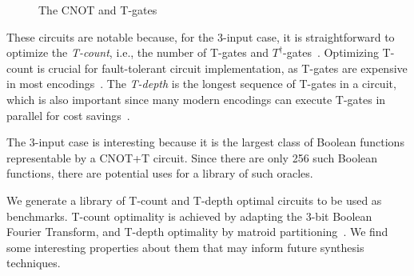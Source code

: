 \documentclass[a4paper]{article}
\makeatletter
\newcommand{\sublabel}[1]{\protected@edef\@currentlabel{\thefigure(\thesubfigure)}\label{#1}}
\makeatother
\begin{document}
\vspace{0.3cm}

\begin{figure}[t]
  \begin{minipage}{0.45\linewidth}
    \centering
    \scalebox{1.0} {
      
    }
    \sublabel{fig-sgate}
    \scalebox{1.0} {
      
    }
    \sublabel{fig-sdgate}
    \scalebox{1.0}{
      
    }
    \sublabel{fig-cnot}
  \end{minipage}
  \begin{minipage}{0.45\linewidth}
  \centering
    \scalebox{1.0} {
      
    }
    \sublabel{fig-tgate}
    \scalebox{1.0} {
      
    }
    \sublabel{fig-tdgate}
    \vspace{0.5cm}
  \end{minipage}
  \caption{The CNOT and T-gates}
  \label{fig-gates}
\end{figure}

\vspace{0.3cm}

These circuits are notable because, for the 3-input case, it is straightforward to optimize the {\it T-count}, i.e., the number of T-gates and $T^{\dagger}$-gates~\cite{amy-meet-in-middle}. Optimizing T-count is crucial for fault-tolerant circuit implementation, as T-gates are expensive in most encodings~\cite{bib-herr-lattice,bib-fowler-bridge}. The {\it T-depth} is the longest sequence of T-gates in a circuit, which is also important since many modern encodings can execute T-gates in parallel for cost savings~\cite{bib-google-ecc}.

\vspace{0.3cm}

The 3-input case is interesting because it is the largest class of Boolean functions representable by a CNOT+T circuit. Since there are only 256 such Boolean functions, there are potential uses for a library of such oracles.

\vspace{0.3cm}

We generate a library of T-count and T-depth optimal circuits to be used as benchmarks. T-count optimality is achieved by adapting the 3-bit Boolean Fourier Transform, and T-depth optimality by matroid partitioning~\cite{bib-amy-matroid}. We find some interesting properties about them that may inform future synthesis techniques.
\end{document}
